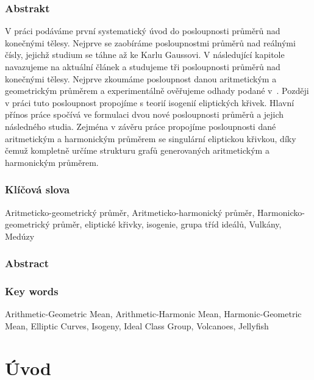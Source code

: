 \documentclass[12pt]{report}
\begin{document}
\newpage
\thispagestyle{empty}
\subsection*{Abstrakt}
V práci podáváme první systematický úvod do posloupnosti průměrů nad konečnými tělesy. Nejprve se zaobíráme posloupnostmi průměrů nad reálnými čísly, jejichž studium se táhne až ke Karlu Gaussovi. V následující kapitole navazujeme na aktuální článek \cite{Meduza} a studujeme tři posloupnosti průměrů nad konečnými tělesy. Nejprve zkoumáme posloupnost danou aritmetickým a geometrickým průměrem a experimentálně ověřujeme odhady podané v~\cite{Meduza}. Později v práci tuto posloupnost propojíme s teorií isogenií eliptických křivek. Hlavní přínos práce spočívá ve formulaci dvou nové posloupnosti průměrů a jejich následného studia. Zejména v závěru práce propojíme posloupnosti dané aritmetickým a harmonickým průměrem se singulární eliptickou křivkou, díky čemuž kompletně určíme strukturu grafů generovaných aritmetickým a harmonickým průměrem.



\subsection*{Klíčová slova}
Aritmeticko-geometrický průměr, Aritmeticko-harmonický průměr, Harmonicko-geometrický průměr, eliptické křivky, isogenie, grupa tříd ideálů, Vulkány, Medúzy


\vspace*{4cm}

\subsection*{Abstract}


\subsection*{Key words}
Arithmetic-Geometric Mean, Arithmetic-Harmonic Mean, Harmonic-Geometric Mean, Elliptic Curves, Isogeny, Ideal Class Group, Volcanoes, Jellyfish




{
\hypersetup{linkcolor=black}
\tableofcontents
}
\thispagestyle{empty}

\chapter*{Úvod}
\end{document}
